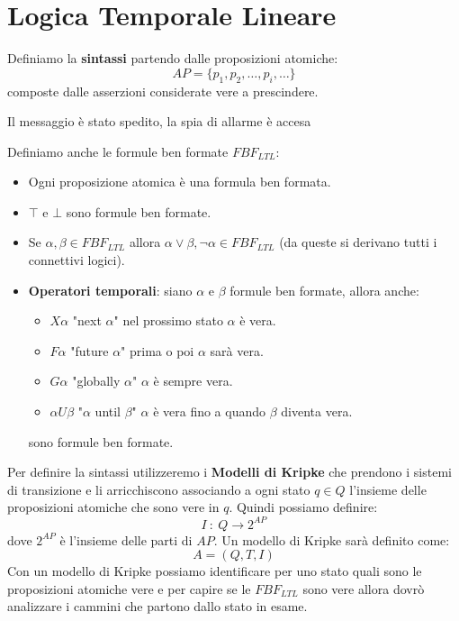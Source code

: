 \section{Logica Temporale Lineare}
Definiamo la \textbf{sintassi} partendo dalle proposizioni atomiche:
\begin{equation}
    AP = \{p_1, p_2, \dots, p_i, \dots\}
\end{equation}
composte dalle asserzioni considerate vere a prescindere.
\begin{esempio}
    Il messaggio è stato spedito, la spia di allarme è accesa
\end{esempio}
Definiamo anche le formule ben formate $FBF_{LTL}$:
\begin{itemize}
    \item Ogni proposizione atomica è una formula ben formata.
    \item $\top$ e $\bot$ sono formule ben formate.
    \item Se $\alpha, \beta \in FBF_{LTL}$ allora $\alpha \lor \beta, \lnot
              \alpha \in FBF_{LTL}$ (da queste si derivano tutti i connettivi
          logici).
    \item \textbf{Operatori temporali}: siano $\alpha$ e $\beta$ formule ben
          formate, allora anche:
          \begin{itemize}
              \item $X\alpha$ "next $\alpha$" nel prossimo stato $\alpha$ è vera.
              \item $F\alpha$ "future $\alpha$" prima o poi $\alpha$ sarà vera.
              \item $G\alpha$ "globally $\alpha$" $\alpha$ è sempre vera.
              \item $\alpha U \beta$ "$\alpha$ until $\beta$" $\alpha$ è vera fino
                    a quando $\beta$ diventa vera.
          \end{itemize}
          sono formule ben formate.
\end{itemize}
Per definire la sintassi utilizzeremo i \textbf{Modelli di Kripke} che prendono
i sistemi di transizione e li arricchiscono associando a ogni stato $q \in Q$
l'insieme delle proposizioni atomiche che sono vere in $q$. Quindi possiamo
definire:
\begin{equation}
    I \ : \ Q \to 2^{AP}
\end{equation}
dove $2^{AP}$ è l'insieme delle parti di $AP$. Un modello di Kripke sarà
definito come:
\begin{equation}
    A = (Q, T, I)
\end{equation}
Con un modello di Kripke possiamo identificare per uno stato quali sono le
proposizioni atomiche vere e per capire se le $FBF_{LTL}$ sono vere allora dovrò
analizzare i cammini che partono dallo stato in esame.

